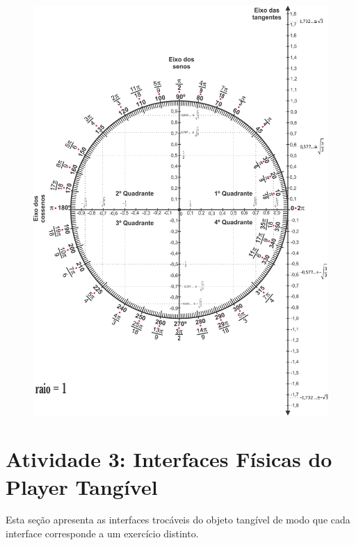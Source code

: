 \begin{figure}[htb]
	\centering
	\includegraphics[width=\linewidth]{chapters/appendixLesson/circulo_trigonometrico.png}
\end{figure}


\clearpage

\section{Atividade 3: Interfaces Físicas do Player Tangível}\label{section:atividade3_interfaces}

Esta seção apresenta as interfaces trocáveis do objeto tangível de modo que cada interface corresponde a um exercício distinto.

